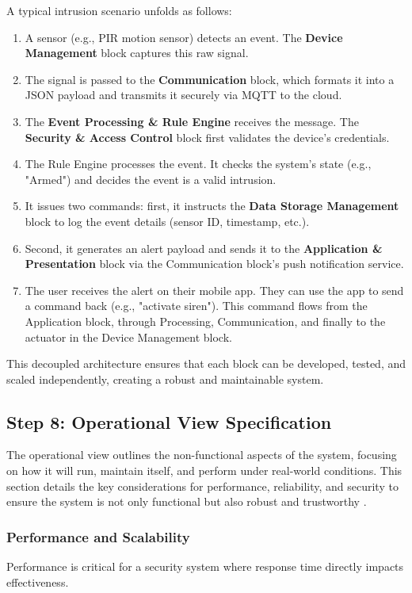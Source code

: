 \documentclass[conference]{IEEEtran}
\begin{document}
A typical intrusion scenario unfolds as follows:
\begin{enumerate}
    \item A sensor (e.g., PIR motion sensor) detects an event. The \textbf{Device Management} block captures this raw signal.
    \item The signal is passed to the \textbf{Communication} block, which formats it into a JSON payload and transmits it securely via MQTT to the cloud.
    \item The \textbf{Event Processing \& Rule Engine} receives the message. The \textbf{Security \& Access Control} block first validates the device's credentials.
    \item The Rule Engine processes the event. It checks the system's state (e.g., "Armed") and decides the event is a valid intrusion.
    \item It issues two commands: first, it instructs the \textbf{Data Storage Management} block to log the event details (sensor ID, timestamp, etc.).
    \item Second, it generates an alert payload and sends it to the \textbf{Application \& Presentation} block via the Communication block's push notification service.
    \item The user receives the alert on their mobile app. They can use the app to send a command back (e.g., "activate siren"). This command flows from the Application block, through Processing, Communication, and finally to the actuator in the Device Management block.
\end{enumerate}
This decoupled architecture ensures that each block can be developed, tested, and scaled independently, creating a robust and maintainable system.




\subsection{Step 8: Operational View Specification}
The operational view outlines the non-functional aspects of the system, focusing on how it will run, maintain itself, and perform under real-world conditions. This section details the key considerations for performance, reliability, and security to ensure the system is not only functional but also robust and trustworthy \cite{wang_iot_devices_security_2024, design_implementation_smart_home_IoT_2024, article_S266729522100026X}.

\subsubsection{Performance and Scalability}
Performance is critical for a security system where response time directly impacts effectiveness.
\end{document}
